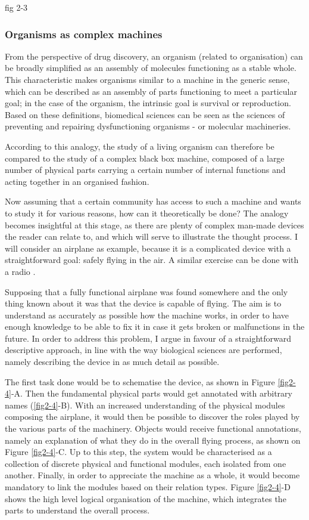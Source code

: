 fig 2-3

\subsubsection{Organisms as complex machines}

From the perspective of drug discovery, an organism (related to organisation) can be broadly simplified as an assembly of molecules functioning as a stable whole. This characteristic makes organisms similar to a machine in the generic sense, which can be described as an assembly of parts functioning to meet a particular goal; in the case of the organism, the intrinsic goal is survival or reproduction. Based on these definitions, biomedical sciences can be seen as the sciences of preventing and repairing dysfunctioning organisms - or molecular machineries.

According to this analogy, the study of a living organism can therefore be compared to the study of a complex black box machine, composed of a large number of physical parts carrying a certain number of internal functions and acting together in an organised fashion.

Now assuming that a certain community has access to such a machine and wants to study it for various reasons, how can it theoretically be done? The analogy becomes insightful at this stage, as there are plenty of complex man-made devices the reader can relate to, and which will serve to illustrate the thought process. I will consider an airplane as example, because it is a complicated device with a straightforward goal: safely flying in the air. A similar exercise can be done with a radio \citep{lazebnik2002can}.

Supposing that a fully functional airplane was found somewhere and the only thing known about it was that the device is capable of flying. The aim is to understand as accurately as possible how the machine works, in order to have enough knowledge to be able to fix it in case it gets broken or malfunctions in the future. In order to address this problem, I argue in favour of a straightforward descriptive approach, in line with the way biological sciences are performed, namely describing the device in as much detail as possible.

The first task done would be to schematise the device, as shown in Figure \ref{fig2-4}-A. Then the fundamental physical parts would get annotated with arbitrary names (\ref{fig2-4}-B). With an increased understanding of the physical modules composing the airplane, it would then be possible to discover the roles played by the various parts of the machinery. Objects would receive functional annotations, namely an explanation of what they do in the overall flying process, as shown on Figure \ref{fig2-4}-C. Up to this step, the system would be characterised as a collection of discrete physical and functional modules, each isolated from one another. Finally, in order to appreciate the machine as a whole, it would become mandatory to link the modules based on their relation types. Figure \ref{fig2-4}-D shows the high level logical organisation of the machine, which integrates the parts to understand the overall process.


